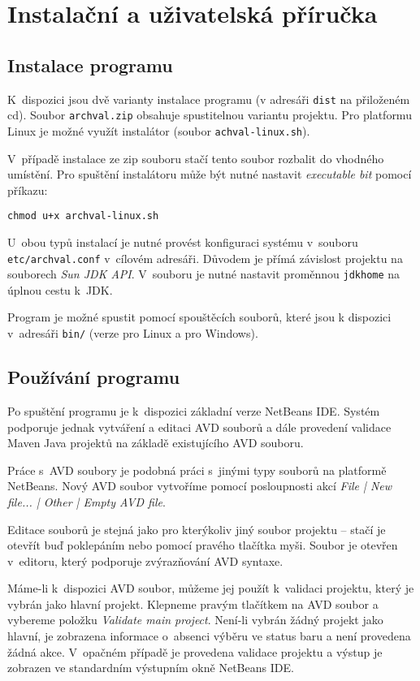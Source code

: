 \chapter{Instalační a uživatelská příručka}

\section{Instalace programu}

K~dispozici jsou dvě varianty instalace programu (v adresáři \verb+dist+ na přiloženém cd). Soubor \verb+archval.zip+ obsahuje spustitelnou variantu projektu. Pro platformu Linux je možné využít instalátor (soubor \verb+achval-linux.sh+).

V~případě instalace ze zip souboru stačí tento soubor rozbalit do vhodného umístění. Pro spuštění instalátoru může být nutné nastavit \emph{executable bit} pomocí příkazu:

\begin{verbatim}
chmod u+x archval-linux.sh
\end{verbatim}

U~obou typů instalací je nutné provést konfiguraci systému v~souboru \verb+etc/archval.conf+ v~cílovém adresáři. Důvodem je přímá závislost projektu na souborech \emph{Sun JDK API}. V~souboru je nutné nastavit proměnnou \verb+jdkhome+ na úplnou cestu k~JDK.

Program je možné spustit pomocí spouštěcích souborů, které jsou k dispozici v~adresáři \verb+bin/+ (verze pro Linux a pro Windows).

\section{Používání programu}
Po spuštění programu je k~dispozici základní verze NetBeans IDE. Systém podporuje jednak vytváření a editaci AVD souborů a dále provedení validace Maven Java projektů na základě existujícího AVD souboru.

Práce s~AVD soubory je podobná práci s~jinými typy souborů na platformě NetBeans. Nový AVD soubor vytvoříme pomocí posloupnosti akcí \emph{File | New file... | Other | Empty AVD file}.

Editace souborů je stejná jako pro kterýkoliv jiný soubor projektu -- stačí je otevřít buď poklepáním nebo pomocí pravého tlačítka myši. Soubor je otevřen v~editoru, který podporuje zvýrazňování AVD syntaxe.

Máme-li k~dispozici AVD soubor, můžeme jej použít k~validaci projektu, který je vybrán jako hlavní projekt. Klepneme pravým tlačítkem na AVD soubor a vybereme položku \emph{Validate main project}. Není-li vybrán žádný projekt jako hlavní, je zobrazena informace o~absenci výběru ve status baru a není provedena žádná akce. V~opačném případě je provedena validace projektu a výstup je zobrazen ve standardním výstupním okně NetBeans IDE.


